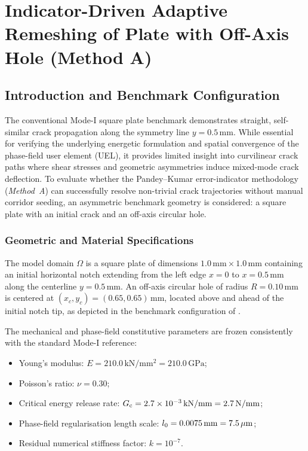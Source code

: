 \chapter{Indicator-Driven Adaptive Remeshing of Plate with Off-Axis Hole (Method A)}
\label{cha:method_a_hole}

\section{Introduction and Benchmark Configuration}
\label{sec:hole_introduction}

The conventional Mode-I square plate benchmark demonstrates straight, self-similar crack propagation along the symmetry line $y = 0.5\,\mathrm{mm}$. While essential for verifying the underlying energetic formulation and spatial convergence of the phase-field user element (UEL), it provides limited insight into curvilinear crack paths where shear stresses and geometric asymmetries induce mixed-mode crack deflection. To evaluate whether the Pandey--Kumar error-indicator methodology (\emph{Method~A}) can successfully resolve non-trivial crack trajectories without manual corridor seeding, an asymmetric benchmark geometry is considered: a square plate with an initial crack and an off-axis circular hole.

\subsection{Geometric and Material Specifications}
\label{subsec:hole_geometry}

The model domain $\Omega$ is a square plate of dimensions $1.0\,\mathrm{mm} \times 1.0\,\mathrm{mm}$ containing an initial horizontal notch extending from the left edge $x = 0$ to $x = 0.5\,\mathrm{mm}$ along the centerline $y = 0.5\,\mathrm{mm}$. An off-axis circular hole of radius $R = 0.10\,\mathrm{mm}$ is centered at $(x_c, y_c) = (0.65, 0.65)\,\mathrm{mm}$, located above and ahead of the initial notch tip, as depicted in the benchmark configuration of \citet{pandey2025}. 

The mechanical and phase-field constitutive parameters are frozen consistently with the standard Mode-I reference:
\begin{itemize}
  \item Young's modulus: $E = 210.0\,\mathrm{kN/mm^2} = 210.0\,\mathrm{GPa}$;
  \item Poisson's ratio: $\nu = 0.30$;
  \item Critical energy release rate: $G_{\mathrm{c}} = 2.7 \times 10^{-3}\,\mathrm{kN/mm} = 2.7\,\mathrm{N/mm}$;
  \item Phase-field regularisation length scale: $l_0 = 0.0075\,\mathrm{mm} = 7.5\,\mu\mathrm{m}$;
  \item Residual numerical stiffness factor: $k = 10^{-7}$.
\end{itemize}

